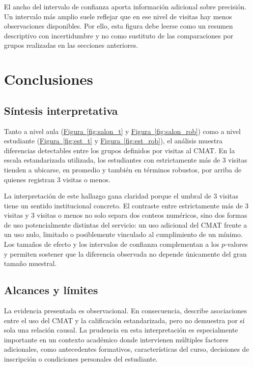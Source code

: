 \documentclass[8pt,a4paper]{article} %
\numberwithin{figure}{subsection}
\begin{document}
El ancho del intervalo de confianza aporta información adicional sobre precisión. Un intervalo más amplio suele reflejar que en ese nivel de visitas hay menos observaciones disponibles. Por ello, esta figura debe leerse como un resumen descriptivo con incertidumbre y no como sustituto de las comparaciones por grupos realizadas en las secciones anteriores.



\FloatBarrier
\newpage
\section{Conclusiones}

\subsection{Síntesis interpretativa}
Tanto a nivel aula (\hyperref[fig:salon_t]{Figura~\ref{fig:salon_t}} y \hyperref[fig:salon_rob]{Figura~\ref{fig:salon_rob}}) como a nivel estudiante (\hyperref[fig:est_t]{Figura~\ref{fig:est_t}} y \hyperref[fig:est_rob]{Figura~\ref{fig:est_rob}}), el análisis muestra diferencias detectables entre los grupos definidos por visitas al CMAT. En la escala estandarizada utilizada, los estudiantes con estrictamente más de 3 visitas tienden a ubicarse, en promedio y también en términos robustos, por arriba de quienes registran 3 visitas o menos.

La interpretación de este hallazgo gana claridad porque el umbral de 3 visitas tiene un sentido institucional concreto. El contraste entre estrictamente más de 3 visitas y 3 visitas o menos no solo separa dos conteos numéricos, sino dos formas de uso potencialmente distintas del servicio: un uso adicional del CMAT frente a un uso nulo, limitado o posiblemente vinculado al cumplimiento de un mínimo. Los tamaños de efecto y los intervalos de confianza complementan a los $p$-valores y permiten sostener que la diferencia observada no depende únicamente del gran tamaño muestral.

\subsection{Alcances y límites}
La evidencia presentada es observacional. En consecuencia, describe asociaciones entre el uso del CMAT y la calificación estandarizada, pero no demuestra por sí sola una relación causal. La prudencia en esta interpretación es especialmente importante en un contexto académico donde intervienen múltiples factores adicionales, como antecedentes formativos, características del curso, decisiones de inscripción o condiciones personales del estudiante.
\end{document}
